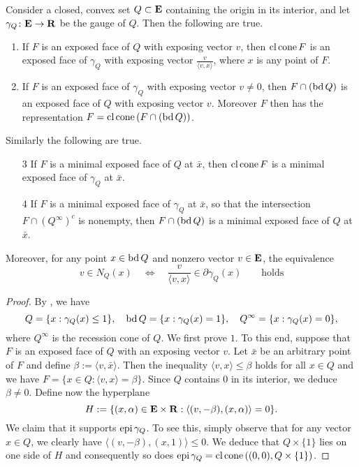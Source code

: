 \documentclass[smallextended,numbook]{svjour3}
\begin{document}
\begin{appendices}
\begin{prop}\label{prop:gauge} {\hfill \\}
Consider a closed, convex set $Q\subset{{\bf E}}$ containing the origin in its interior, and let $\gamma_Q\colon{{\bf E}}\to{{\bf R}}$ be the gauge of $Q$. Then the following are true.
\begin{enumerate}
\item If $F$ is an exposed face of $Q$ with exposing vector $v$, then ${\mbox{\rm cl}\,} {\mbox{\rm cone}\,} F$ is an exposed face of $\gamma_Q$ with exposing vector $\frac{v}{\langle v,x\rangle}$, where $x$ is any point of $F$. 
\item If $F$ is an exposed face of $\gamma_Q$ with exposing vector $v\neq 0$, then $F\cap ({\mbox{\rm bd}\,} Q)$ is an exposed face of $Q$ with exposing vector $v$. Moreover $F$ then has the representation $F={\mbox{\rm cl}\,}{\mbox{\rm cone}\,} (F\cap ({\mbox{\rm bd}\,} Q))$.
\end{enumerate}
Similarly the following are true.
\begin{enumerate}
\item[3] If $F$ is a minimal exposed face of $Q$ at $\bar{x}$, then ${\mbox{\rm cl}\,} {\mbox{\rm cone}\,} F$ is a minimal exposed face of $\gamma_Q$ at $\bar{x}$. 
\item[4] If $F$ is a minimal exposed face of $\gamma_Q$ at $\bar{x}$, so that the intersection $F\cap (Q^{\infty})^c$ is nonempty, then $F\cap ({\mbox{\rm bd}\,} Q)$ is a minimal exposed face of $Q$ at $\bar{x}$.
\end{enumerate}
Moreover, for any point $x\in {\mbox{\rm bd}\,} Q$ and nonzero vector $v\in{{\bf E}}$, the equivalence
\begin{equation}\label{eqn:equiv}
v\in N_Q(x) \quad \Longleftrightarrow \quad \frac{v}{\langle v,x \rangle}\in\partial \gamma_Q(x)\qquad \textrm{holds}
\end{equation}
\end{prop}
\begin{proof}
By \cite[Corollary~9.7.1]{con_ter}, we have
$$Q=\{x: \gamma_Q(x)\leq 1\}, \quad{\mbox{\rm bd}\,} Q=\{x: \gamma_Q(x)= 1\}, \quad Q^{\infty}=\{x: \gamma_Q(x)=0\},$$
where $Q^{\infty}$ is the recession cone of $Q$.
We first prove $1$. To this end, suppose that $F$ is an exposed face of $Q$ with an exposing vector $v$. Let $\bar{x}$ be an arbitrary point of $F$ and define $\beta:= \langle v,\bar{x}\rangle$. Then the inequality
$\langle v,x\rangle\leq \beta$ holds for all $x\in Q$ and we have $F=\{x\in Q: \langle v,x\rangle = \beta\}$. Since $Q$ contains $0$ in its interior, we deduce $\beta \neq 0$.
Define now the hyperplane $$H:=\{(x,\alpha)\in{{\bf E}}\times{{\bf R}} : \langle (v,-\beta), (x,\alpha) \rangle = 0\}.$$ We claim that it supports ${\mbox{\rm epi}\,} \gamma_Q$.
To see this, simply observe that for any vector $x\in Q$, we clearly have   
$\langle (v,-\beta), (x,1) \rangle\leq 0$. We deduce that $Q\times\{1\}$ lies on one side of $H$ and consequently so does ${\mbox{\rm epi}\,}\gamma_Q={\mbox{\rm cl}\,}{\mbox{\rm cone}\,} ((0,0),Q\times\{1\})$.


\end{proof}
\end{appendices}
\end{document}
